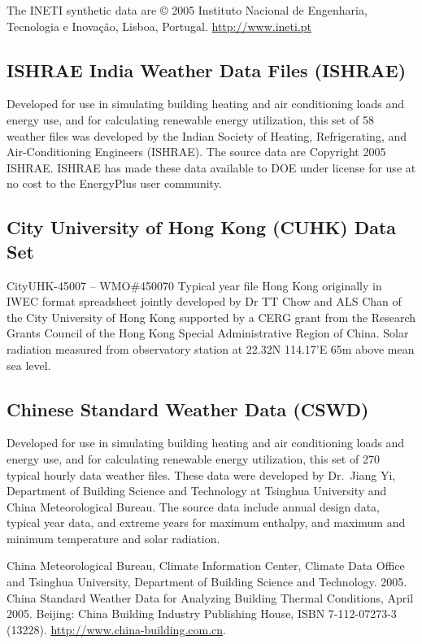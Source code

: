 The INETI synthetic data are © 2005 Instituto Nacional de Engenharia, Tecnologia e Inovação, Lisboa, Portugal. \url{http://www.ineti.pt}

\subsection{ISHRAE India Weather Data Files (ISHRAE)}\label{ishrae-india-weather-data-files-ishrae}

Developed for use in simulating building heating and air conditioning loads and energy use, and for calculating renewable energy utilization, this set of 58 weather files was developed by the Indian Society of Heating, Refrigerating, and Air-Conditioning Engineers (ISHRAE). The source data are Copyright 2005 ISHRAE. ISHRAE has made these data available to DOE under license for use at no cost to the EnergyPlus user community.

\subsection{City University of Hong Kong (CUHK) Data Set}\label{city-university-of-hong-kong-cuhk-data-set}

CityUHK-45007 -- WMO\#450070 Typical year file Hong Kong originally in IWEC format spreadsheet jointly developed by Dr TT Chow and ALS Chan of the City University of Hong Kong supported by a CERG grant from the Research Grants Council of the Hong Kong Special Administrative Region of China. Solar radiation measured from observatory station at 22.32N 114.17'E 65m above mean sea level.

\subsection{Chinese Standard Weather Data (CSWD)}\label{chinese-standard-weather-data-cswd}

Developed for use in simulating building heating and air conditioning loads and energy use, and for calculating renewable energy utilization, this set of 270 typical hourly data weather files. These data were developed by Dr.~Jiang Yi, Department of Building Science and Technology at Tsinghua University and China Meteorological Bureau. The source data include annual design data, typical year data, and extreme years for maximum enthalpy, and maximum and minimum temperature and solar radiation.

China Meteorological Bureau, Climate Information Center, Climate Data Office and Tsinghua University, Department of Building Science and Technology. 2005. China Standard Weather Data for Analyzing Building Thermal Conditions, April 2005. Beijing: China Building Industry Publishing House, ISBN 7-112-07273-3 (13228). \url{http://www.china-building.com.cn}.

